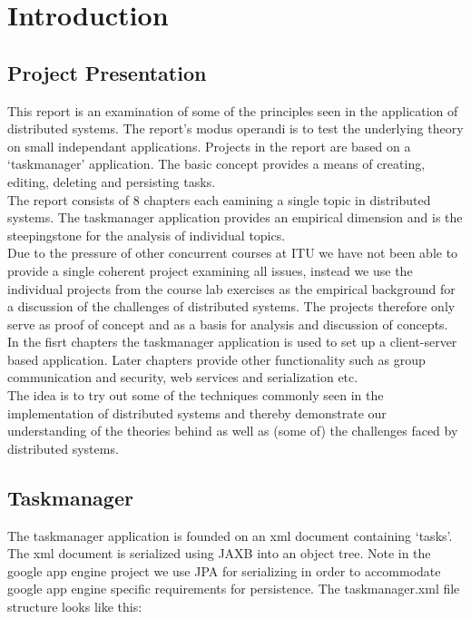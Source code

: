 \chapter{Introduction}
\section{Project Presentation}

This report is an examination of some of the principles seen in the application of distributed systems. The report's modus operandi is to test the underlying theory on small independant applications. Projects in the report are based on a ‘taskmanager’ application. The basic concept provides a means of creating, editing, deleting and persisting tasks. \\

The report consists of 8 chapters each eamining a single topic in distributed systems. The taskmanager application provides an empirical dimension and is the steepingstone for the analysis of individual topics. \\

Due to the pressure of other concurrent courses at ITU we have not been able to provide a single coherent project examining all issues, instead we use the individual projects from the course lab exercises as the empirical background for a discussion of the challenges of distributed systems. The projects therefore only serve as proof of concept and as a basis for analysis and discussion of concepts.  \\

In the fisrt chapters the taskmanager application is used to set up a client-server based application. Later chapters provide other functionality such as group communication and security, web services and serialization etc. \\

The idea is to try out some of the techniques commonly seen in the implementation of distributed systems and thereby demonstrate our understanding of the theories behind as well as (some of) the challenges faced by distributed systems. 

\section{Taskmanager}

The taskmanager application is founded on an xml document containing ‘tasks’. The xml document is serialized using JAXB into an object tree. Note in the google app engine project we use JPA for serializing in order to accommodate google app engine specific requirements for persistence. The taskmanager.xml file structure looks like this:

